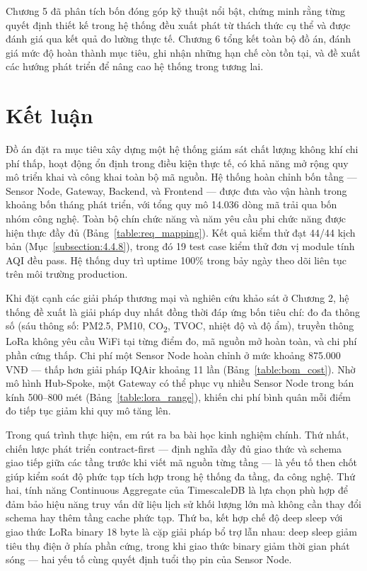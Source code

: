 \documentclass[../DoAn.tex]{subfiles}
\begin{document}
Chương 5 đã phân tích bốn đóng góp kỹ thuật nổi bật, chứng minh rằng từng quyết định thiết kế trong hệ thống đều xuất phát từ thách thức cụ thể và được đánh giá qua kết quả đo lường thực tế. Chương 6 tổng kết toàn bộ đồ án, đánh giá mức độ hoàn thành mục tiêu, ghi nhận những hạn chế còn tồn tại, và đề xuất các hướng phát triển để nâng cao hệ thống trong tương lai.

\section{Kết luận}
\label{section:6.1}

Đồ án đặt ra mục tiêu xây dựng một hệ thống giám sát chất lượng không khí chi phí thấp, hoạt động ổn định trong điều kiện thực tế, có khả năng mở rộng quy mô triển khai và công khai toàn bộ mã nguồn. Hệ thống hoàn chỉnh bốn tầng — Sensor Node, Gateway, Backend, và Frontend — được đưa vào vận hành trong khoảng bốn tháng phát triển, với tổng quy mô 14.036 dòng mã trải qua bốn nhóm công nghệ. Toàn bộ chín chức năng và năm yêu cầu phi chức năng được hiện thực đầy đủ (Bảng~\ref{table:req_mapping}). Kết quả kiểm thử đạt 44/44 kịch bản (Mục~\ref{subsection:4.4.8}), trong đó 19 test case kiểm thử đơn vị module tính \gls{AQI} đều pass. Hệ thống duy trì uptime 100\% trong bảy ngày theo dõi liên tục trên môi trường production.

Khi đặt cạnh các giải pháp thương mại và nghiên cứu khảo sát ở Chương 2, hệ thống đề xuất là giải pháp duy nhất đồng thời đáp ứng bốn tiêu chí: đo đa thông số (sáu thông số: PM2.5, PM10, CO\textsubscript{2}, TVOC, nhiệt độ và độ ẩm), truyền thông \gls{LoRa} không yêu cầu WiFi tại từng điểm đo, mã nguồn mở hoàn toàn, và chi phí phần cứng thấp. Chi phí một Sensor Node hoàn chỉnh ở mức khoảng 875.000 VNĐ — thấp hơn giải pháp IQAir khoảng 11 lần (Bảng~\ref{table:bom_cost}). Nhờ mô hình Hub-Spoke, một Gateway có thể phục vụ nhiều Sensor Node trong bán kính 500–800 mét (Bảng~\ref{table:lora_range}), khiến chi phí bình quân mỗi điểm đo tiếp tục giảm khi quy mô tăng lên.

Trong quá trình thực hiện, em rút ra ba bài học kinh nghiệm chính. Thứ nhất, chiến lược phát triển contract-first — định nghĩa đầy đủ giao thức và schema giao tiếp giữa các tầng trước khi viết mã nguồn từng tầng — là yếu tố then chốt giúp kiểm soát độ phức tạp tích hợp trong hệ thống đa tầng, đa công nghệ. Thứ hai, tính năng Continuous Aggregate của TimescaleDB là lựa chọn phù hợp để đảm bảo hiệu năng truy vấn dữ liệu lịch sử khối lượng lớn mà không cần thay đổi schema hay thêm tầng cache phức tạp. Thứ ba, kết hợp chế độ deep sleep với giao thức LoRa binary 18 byte là cặp giải pháp bổ trợ lẫn nhau: deep sleep giảm tiêu thụ điện ở phía phần cứng, trong khi giao thức binary giảm thời gian phát sóng — hai yếu tố cùng quyết định tuổi thọ pin của Sensor Node.
\end{document}
